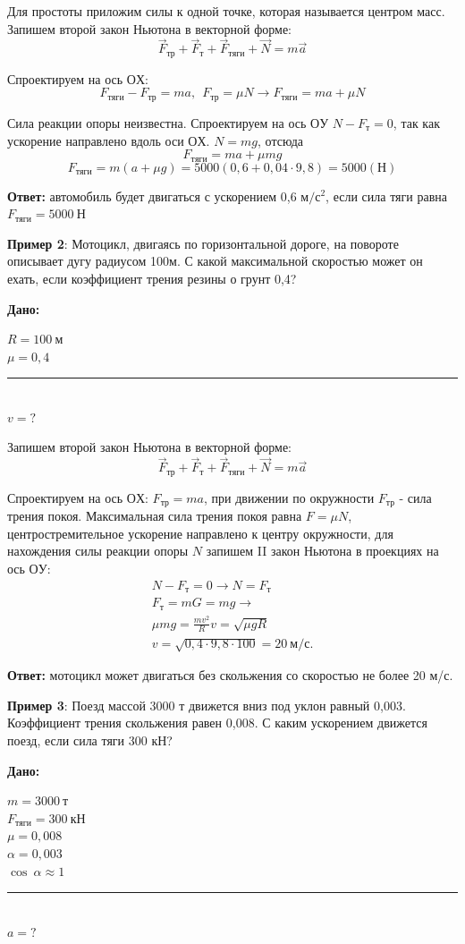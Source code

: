 \documentclass[a5paper, 10pt]{diss_4}
\renewcommand{\'}{\,'}
\begin{document}
Для простоты приложим силы к одной точке, которая называется центром масс. Запишем второй закон Ньютона в векторной форме:
\[
\vec{F}_{тр}+\vec{F}_{т}+\vec{F}_{тяги}+\vec{N}=m\vec{a}
\]

Спроектируем на ось $ОХ$:
\[
F_{тяги}-F_{тр}=ma,\ \ F_{тр}=\mu N\to
F_{тяги}=ma+\mu N
\]

Сила реакции опоры неизвестна. Спроектируем на ось $ОУ$   $N-F_т=0$, так как ускорение направлено вдоль оси $ОХ$.  $N=mg$, отсюда
\[
F_{тяги} = ma+ \mu mg
\]
\[
F_{тяги} = m(a+ \mu g)=5000(0,6+0,04\cdot9,8)=5000 (Н)
\]

\textbf{Ответ:} автомобиль будет двигаться с ускорением 0,6 $м/с^2$, если сила тяги  равна $F_{тяги} = 5000\ Н$

\textbf{Пример 2}: Мотоцикл, двигаясь по горизонтальной дороге, на повороте описывает дугу радиусом 100м. С какой максимальной скоростью может он ехать, если коэффициент трения резины о грунт 0,4?

\hspace{1cm}\textbf{Дано:}\hspace{.3cm}
\parbox[t]{4cm}{
$R=100\ м$\\
$\mu = 0,4$\\
\rule{4cm}{.4pt}\\
$v = ?$\\
}

Запишем второй закон Ньютона в векторной форме:
\[
\vec{F}_{тр}+\vec{F}_{т}+\vec{F}_{тяги}+\vec{N}=m\vec{a}
\]

Спроектируем на ось $ОХ$:
$F_{тр} = ma$, при движении по окружности $F_{тр}$ - сила трения покоя. Максимальная сила трения покоя равна $F=\mu N$, центростремительное ускорение направлено к центру окружности, для нахождения силы реакции опоры $N$ запишем  II закон Ньютона в проекциях  на ось $ОУ$:
\begin{gather*}
N-F_т=0\to N=F_т\\
F_т=mG=mg\to\\
\mu mg=\frac{mv^2}{R}v=\sqrt{\mu gR}\\
v=\sqrt{0,4\cdot9,8\cdot100}=20\ м/с.
\end{gather*}

\textbf{Ответ:} мотоцикл может двигаться без скольжения со скоростью не более 20 м/с.

\textbf{Пример 3}: Поезд массой 3000 т движется вниз под уклон равный 0,003. Коэффициент трения  скольжения равен 0,008. С каким ускорением движется поезд, если сила тяги 300 кН?

\hspace{1cm}\textbf{Дано:}\hspace{.3cm}
\parbox[t]{4cm}{
$m = 3000\ т$\\
$F_{тяги} = 300\ кН$\\
$\mu = 0,008$\\
$\alpha=0,003$\\
$\cos\ \alpha\approx1$\\
\rule{4cm}{.4pt}\\
$a = ?$\\
}
\end{document}
